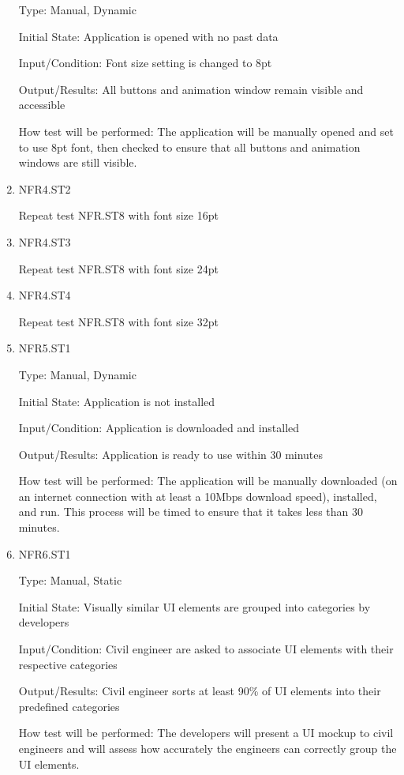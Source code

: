 \documentclass[12pt, titlepage]{article}
\begin{document}
\begin{enumerate}
Type: Manual, Dynamic

Initial State: Application is opened with no past data

Input/Condition: Font size setting is changed to 8pt

Output/Results: All buttons and animation window remain visible and accessible

How test will be performed: The application will be manually opened and set to use 8pt font, then checked to ensure that all buttons and animation windows are still visible.

\item{NFR4.ST2\\}

Repeat test NFR.ST8 with font size 16pt

\item{NFR4.ST3\\}

Repeat test NFR.ST8 with font size 24pt

\item{NFR4.ST4\\}

Repeat test NFR.ST8 with font size 32pt

\item{NFR5.ST1\\}

Type: Manual, Dynamic

Initial State: Application is not installed

Input/Condition: Application is downloaded and installed

Output/Results: Application is ready to use within 30 minutes

How test will be performed: The application will be manually downloaded (on an internet connection with at least a 10Mbps download speed), installed, and run. This process will be timed to ensure that it takes less than 30 minutes.

\item{NFR6.ST1\\}

Type: Manual, Static

Initial State: Visually similar UI elements are grouped into categories by developers

Input/Condition: Civil engineer are asked to associate UI elements with their respective categories

Output/Results: Civil engineer sorts at least 90\% of UI elements into their predefined categories

How test will be performed: The developers will present a UI mockup to civil engineers and will assess how accurately the engineers can correctly group the UI elements.

\end{enumerate}
\end{document}
